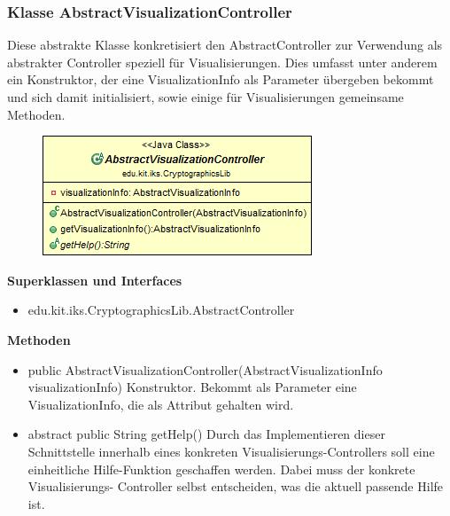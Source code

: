 \documentclass{article}
\begin{document}
	\subsubsection{Klasse AbstractVisualizationController}
	  Diese abstrakte Klasse konkretisiert den AbstractController zur Verwendung als
	  abstrakter Controller speziell für Visualisierungen. Dies umfasst unter anderem
	  ein Konstruktor, der eine VisualizationInfo als Parameter übergeben bekommt und
	  sich damit initialisiert, sowie einige für Visualisierungen gemeinsame Methoden.
	
      \begin{figure}[H]
        \centering
        \includegraphics[width=\textwidth]{resources/edu-kit-iks-CryptographicsLib-AbstractVisualizationController}
      \end{figure}
	
      \textbf{Superklassen und Interfaces}
      \begin{itemize}
        \item edu.kit.iks.CryptographicsLib.AbstractController
      \end{itemize}
	
      \textbf{Methoden}
      \begin{itemize}
        \item public AbstractVisualizationController(AbstractVisualizationInfo visualizationInfo) \newline
          Konstruktor. Bekommt als Parameter eine VisualizationInfo, die als Attribut gehalten wird.
        \item abstract public String getHelp() \newline
          Durch das Implementieren dieser Schnittstelle innerhalb eines konkreten Visualisierungs-Controllers
          soll eine einheitliche Hilfe-Funktion geschaffen werden. Dabei muss der konkrete Visualisierungs-
          Controller selbst entscheiden, was die aktuell passende Hilfe ist.
      \end{itemize}
      
\end{document}
